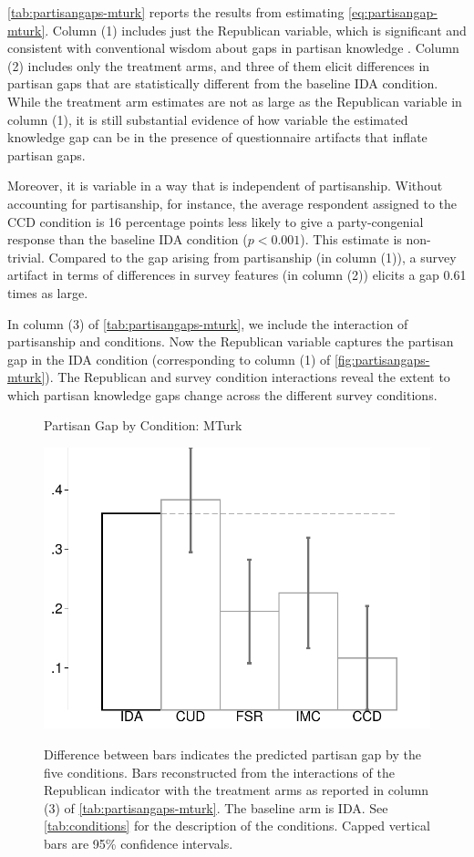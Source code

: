 \documentclass[12pt, letterpaper]{article}
\begin{document}
\cref{tab:partisangaps-mturk} reports the results from estimating \cref{eq:partisangap-mturk}. Column (1) includes just the Republican variable, which is significant and consistent with conventional wisdom about gaps in partisan knowledge \citep[e.g.][]{bullocketal_2015, pew2018disagree}.
Column (2) includes only the treatment arms, and three of them elicit differences in partisan gaps that are statistically different from the baseline IDA condition. While the treatment arm estimates are not as large as the Republican variable in column (1), it is still substantial evidence of how variable the estimated knowledge gap can be in the presence of questionnaire artifacts that inflate partisan gaps.

Moreover, it is variable in a way that is independent of partisanship. Without accounting for partisanship, for instance, the average respondent assigned to the CCD condition is 16 percentage points less likely to give a party-congenial response than the baseline IDA condition ($p<0.001$). This estimate is non-trivial.
Compared to the gap arising from partisanship (in column (1)), a survey artifact in terms of differences in survey features (in column (2)) elicits a gap 0.61 times as large.

In column (3) of \cref{tab:partisangaps-mturk}, we include the interaction of partisanship and conditions. Now the Republican variable captures the partisan gap in the IDA condition (corresponding to column (1) of \cref{fig:partisangaps-mturk}). The Republican and survey condition interactions reveal the extent to which partisan knowledge gaps change across the different survey conditions. 

\begin{figure}[t]
	\centering
	\caption{Partisan Gap by Condition: MTurk}
	\includegraphics[width=.55\textwidth]{../figs/mturk-pgag-surveyarms.pdf}
	\label{fig:partisangaps-mturk-reg}
	\caption*{\footnotesize
		Difference between bars indicates the predicted partisan gap by the five conditions.
		Bars reconstructed from the interactions of the Republican indicator with the treatment arms as reported in column (3) of \cref{tab:partisangaps-mturk}.
		The baseline arm is IDA.
		See \cref{tab:conditions} for the description of the conditions.
		Capped vertical bars are 95\% confidence intervals.
	}
\end{figure}
\end{document}

